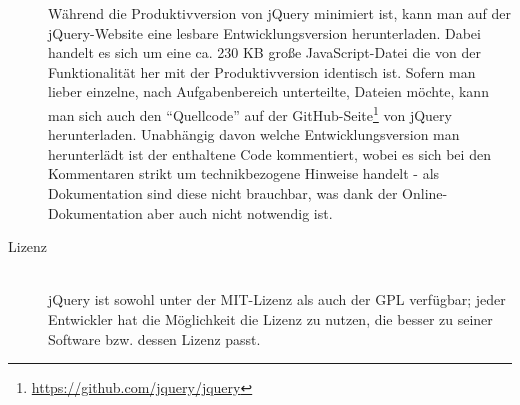 \begin{description}
Während die Produktivversion von jQuery minimiert ist, kann man auf der jQuery-Website eine lesbare
Entwicklungsversion herunterladen. Dabei handelt es sich um eine ca. 230 KB große JavaScript-Datei
die von der Funktionalität her mit der Produktivversion identisch ist. Sofern man lieber einzelne,
nach Aufgabenbereich unterteilte, Dateien möchte, kann man sich auch den \enquote{Quellcode} auf der
GitHub-Seite\footnote{\href{https://github.com/jquery/jquery}{https://github.com/jquery/jquery}} von
jQuery herunterladen. Unabhängig davon welche Entwicklungsversion man herunterlädt ist der
enthaltene Code kommentiert, wobei es sich bei den Kommentaren strikt um technikbezogene Hinweise
handelt - als Dokumentation sind diese nicht brauchbar, was dank der Online-Dokumentation aber auch
nicht notwendig ist.

\item[Lizenz] \hfill \\
jQuery ist sowohl unter der MIT-Lizenz als auch der GPL verfügbar; jeder Entwickler hat die
Möglichkeit die Lizenz zu nutzen, die besser zu seiner Software bzw. dessen Lizenz passt.
\end{description}



